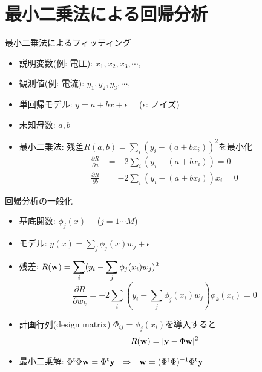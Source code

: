 \section{最小二乗法による回帰分析}

\begin{frame}[t,fragile]{最小二乗法によるフィッティング}
  \begin{itemize}
  \item 説明変数(例: 電圧): $x_1,x_2,x_3,\cdots,$
  \item 観測値(例: 電流): $y_1,y_2,y_3,\cdots,$
  \item 単回帰モデル: $y=a+bx+\epsilon$ \ \ ($\epsilon$: ノイズ)
  \item 未知母数: $a,b$
  \item 最小二乗法:
    残差$\displaystyle R(a,b) = \sum_i (y_i - (a+bx_i))^2$を最小化
    \[
    \begin{split}
      \frac{\partial R}{\partial a} &= - 2 \sum_i (y_i - (a+bx_i)) = 0 \\
      \frac{\partial R}{\partial b} &= - 2 \sum_i (y_i - (a+bx_i))x_i = 0
    \end{split}
    \]
  \end{itemize}
\end{frame}

\begin{frame}[t,fragile]{回帰分析の一般化}
  \begin{itemize}
  \item 基底関数: $\phi_j(x)$ \ \ ($j=1 \cdots M$)
  \item モデル: $\displaystyle y(x) = \sum_j \phi_j(x) w_j + \epsilon$
  \item 残差: $\displaystyle R({\bf w}) = \sum_i (y_i - \sum_j \phi_j(x_i) w_j)^2$
    \[
    \frac{\partial R}{\partial w_k} = -2 \sum_i (y_i - \sum_j \phi_j(x_i) w_j) \phi_k(x_i) = 0
    \]
  \item 計画行列(design matrix) $\Phi_{ij} = \phi_j(x_i)$を導入すると
    \[
    R({\bf w}) = | {\bf y} - \Phi {\bf w} |^2
    \]
  \item 最小二乗解: $\Phi^{\rm t} \Phi {\bf w} = \Phi^{\rm t} {\bf y} \ \ \Rightarrow \ \
{\bf w} = (\Phi^{\rm t} \Phi)^{-1}\Phi^{\rm t} {\bf y}$
  \end{itemize}
\end{frame}

